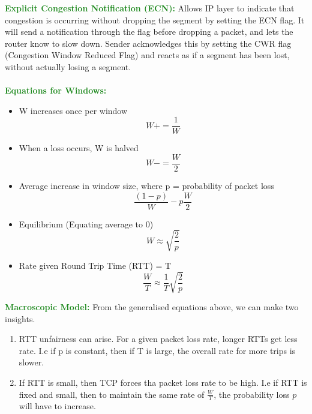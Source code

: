 \documentclass[a4paper,10pt]{article}
\begin{document}
\textcolor{ForestGreen}{\textbf{Explicit Congestion Notification (ECN):}} Allows IP layer to indicate that congestion is occurring without dropping the segment by setting the ECN flag. It will send a notification through the flag before dropping a packet, and lets the router know to slow down. Sender acknowledges this by setting the CWR flag (Congestion Window Reduced Flag) and reacts as if a segment has been lost, without actually losing a segment. \\\\
\textcolor{ForestGreen}{\textbf{Equations for Windows:}}
\begin{itemize}
	\item W increases once per window \\
	\begin{equation*}
		W += \frac{1}{W}
	\end{equation*}
	\item When a loss occurs, W is halved \\ 
	\begin{equation*}
		W -= \frac{W}{2}
	\end{equation*}
	\item Average increase in window size, where p = probability of packet loss \\
	\begin{equation*}
		\frac{(1-p)}{W} - p \frac{W}{2}
	\end{equation*}
	\item Equilibrium (Equating average to 0)
	\begin{equation*}
		W \approx \sqrt{\frac{2}{p}}
	\end{equation*}
	\item Rate given Round Trip Time (RTT) = T 
	\begin{equation*}
		\frac{W}{T} \approx \frac{1}{T}\sqrt{\frac{2}{p}}
	\end{equation*}
\end{itemize}
\textcolor{ForestGreen}{\textbf{Macroscopic Model:}} From the generalised equations above, we can make two insights. 
\begin{enumerate}
	\item RTT unfairness can arise. For a given packet loss rate, longer RTTs get less rate. I.e if p is constant, then if T is large, the overall rate for more trips is slower. 
	\item If RTT is small, then TCP forces tha packet loss rate to be high. I.e if RTT is fixed and small, then to maintain the same rate of $\frac{W}{T}$, the probability loss $p$ will have to increase. 
\end{enumerate}
\end{document}
